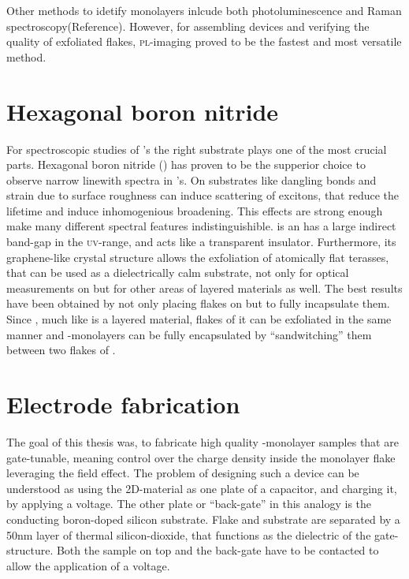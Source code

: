 Other methods to idetify monolayers inlcude both photoluminescence and Raman spectroscopy(Reference). However, for assembling devices and verifying the quality of exfoliated flakes, \textsc{pl}-imaging proved to be the fastest and most versatile method.

\section{Hexagonal boron nitride}

For spectroscopic studies of \tmd's the right substrate plays one of the most crucial parts. Hexagonal boron nitride (\hbn) has proven to be the supperior choice to observe narrow linewith spectra in \tmd's. On substrates like \sio dangling bonds and strain due to surface roughness can induce scattering of excitons, that reduce the lifetime and induce inhomogenious broadening. This effects are strong enough make many different spectral features indistinguishible. \hbn is an has a large indirect band-gap in the \textsc{uv}-range, and acts like a transparent insulator. Furthermore, its graphene-like crystal structure allows the exfoliation of atomically flat terasses, that can be used as a dielectrically calm substrate, not only for optical measurements on \tmds but for other areas of layered materials as well. The best results have been obtained by not only placing flakes on \hbn but to fully incapsulate them. Since \hbn, much like \tmds is a layered material, flakes of it can be exfoliated in the same manner and \tmd-monolayers can be fully encapsulated by ``sandwitching'' them between two flakes of \hbn.

\section{Electrode fabrication}

The goal of this thesis was, to fabricate high quality \tmd-monolayer samples that are gate-tunable, meaning control over the charge density inside the monolayer flake leveraging the field effect. The problem of designing such a device can be understood as using the 2D-material as one plate of a capacitor, and charging it, by applying a voltage. The other plate or ``back-gate'' in this analogy is the conducting boron-doped silicon substrate. Flake and substrate are separated by a 50nm layer of thermal silicon-dioxide, that functions as the dielectric of the gate-structure. Both the sample on top and the back-gate have to be contacted to allow the application of a voltage.


